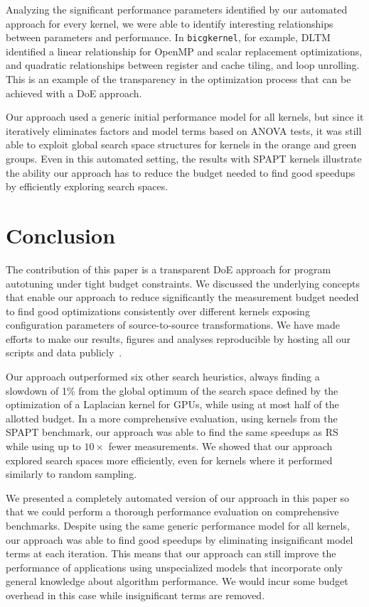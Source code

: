 \documentclass[conference]{IEEEtran}
\begin{document}
Analyzing  the significant  performance parameters  identified by  our automated
approach for  every kernel, we  were able to identify  interesting relationships
between parameters and performance. In  \texttt{bicgkernel}, for example, DLTM identified
a  linear relationship  for  OpenMP and  scalar  replacement optimizations,  and
quadratic   relationships  between   register   and  cache   tiling,  and   loop
unrolling. This  is an example of  the transparency in the  optimization process
that can be achieved with a DoE approach.

Our approach used a generic initial performance model for all kernels, but since
it iteratively eliminates  factors and model terms based on  ANOVA tests, it was
still able to  exploit global search space structures for  kernels in the orange
and green groups. Even in this automated setting, the results with SPAPT kernels
illustrate the ability our approach has to reduce the budget needed to find good
speedups by efficiently exploring search spaces.
\section{Conclusion}
\label{sec:orgad88b73}
The  contribution of  this  paper  is a  transparent  DoE  approach for  program
autotuning under tight budget constraints.  We discussed the underlying concepts
that enable our  approach to reduce significantly the  measurement budget needed
to  find  good  optimizations   consistently  over  different  kernels  exposing
configuration  parameters  of  source-to-source transformations.  We  have  made
efforts to  make our results, figures  and analyses reproducible by  hosting all
our scripts and data publicly~\cite{bruel2018ccgrid19}.

Our approach outperformed six other search heuristics, always finding a slowdown
of 1\% from the global optimum of the search space defined by the optimization of
a Laplacian kernel for GPUs, while using at most half of the allotted budget. In
a more  comprehensive evaluation,  using kernels from  the SPAPT  benchmark, our
approach was able to find the same speedups  as RS while using up to \(10\times\) fewer
measurements.  We  showed   that  our  approach  explored   search  spaces  more
efficiently, even for kernels where it performed similarly to random sampling.

We presented  a completely automated  version of our  approach in this  paper so
that  we  could  perform  a thorough  performance  evaluation  on  comprehensive
benchmarks. Despite  using the same  generic performance model for  all kernels,
our approach was  able to find good speedups by  eliminating insignificant model
terms at  each iteration.  This means  that our approach  can still  improve the
performance  of applications  using unspecialized  models that  incorporate only
general  knowledge  about algorithm  performance.  We  would incur  some  budget
overhead in this case while insignificant terms are removed.
\end{document}
